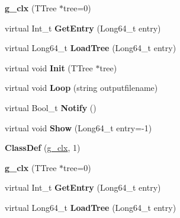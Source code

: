 \begin{DoxyCompactItemize}
\item 
\mbox{\label{classg__clx_aa619daf508fe1d6bddb000af26630f31}} 
{\bfseries g\+\_\+clx} (T\+Tree $\ast$tree=0)
\item 
\mbox{\label{classg__clx_ab4c53e12e70c3671ff8895fc388dd7d2}} 
virtual Int\+\_\+t {\bfseries Get\+Entry} (Long64\+\_\+t entry)
\item 
\mbox{\label{classg__clx_a0aab3745bdb3db08757c974eebffbe39}} 
virtual Long64\+\_\+t {\bfseries Load\+Tree} (Long64\+\_\+t entry)
\item 
\mbox{\label{classg__clx_a92531261155ea15bee6b74c7e491132a}} 
virtual void {\bfseries Init} (T\+Tree $\ast$tree)
\item 
\mbox{\label{classg__clx_aeb5d4743fbc3fa60d189ed91e4c6e246}} 
virtual void {\bfseries Loop} (string outputfilename)
\item 
\mbox{\label{classg__clx_a1fe81316168bc18dc2325ca5595577a9}} 
virtual Bool\+\_\+t {\bfseries Notify} ()
\item 
\mbox{\label{classg__clx_ae86183470c7bb8db45753aa4c86f1d41}} 
virtual void {\bfseries Show} (Long64\+\_\+t entry=-\/1)
\item 
\mbox{\label{classg__clx_a8d0a8ed3a7cc55ca97aeb77f4183d3b8}} 
{\bfseries Class\+Def} (\hyperlink{classg__clx}{g\+\_\+clx}, 1)
\item 
\mbox{\label{classg__clx_aa619daf508fe1d6bddb000af26630f31}} 
{\bfseries g\+\_\+clx} (T\+Tree $\ast$tree=0)
\item 
\mbox{\label{classg__clx_ab4c53e12e70c3671ff8895fc388dd7d2}} 
virtual Int\+\_\+t {\bfseries Get\+Entry} (Long64\+\_\+t entry)
\item 
\mbox{\label{classg__clx_a0aab3745bdb3db08757c974eebffbe39}} 
virtual Long64\+\_\+t {\bfseries Load\+Tree} (Long64\+\_\+t entry)
\item 
\mbox{\label{classg__clx_a92531261155ea15bee6b74c7e491132a}} 

\end{DoxyCompactItemize}
